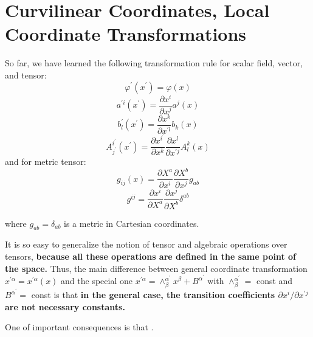 \section{Curvilinear Coordinates, Local Coordinate Transformations}
So far, we have learned the following transformation rule for scalar field, vector, and tensor:
$$
\varphi^{\prime}\left(x^{\prime}\right)=\varphi(x)
$$
$$
a^{\prime i}\left(x^{\prime}\right)=\frac{\partial x^{i}}{\partial x^{j}} a^{j}(x)
$$
$$
b_{l}^{\prime}\left(x^{\prime}\right)=\frac{\partial x^{k}}{\partial x^{\prime l}} b_{k}(x)
$$
$$
A_{j^{\prime}}^{i^{\prime}}\left(x^{\prime}\right)=\frac{\partial x^{i^{\prime}}}{\partial x^{k}} \frac{\partial x^{l}}{\partial x^{\prime j}} A_{l}^{k}(x)
$$
and for metric tensor:
\begin{equation}
    g_{i j}(x)=\frac{\partial X^{a}}{\partial x^{i}} \frac{\partial X^{b}}{\partial x^{j}} g_{a b}
    \label{metric-orthonormal}
\end{equation}
\begin{equation}
    g^{i j}=\frac{\partial x^{i}}{\partial X^{a}} \frac{\partial x^{j}}{\partial X^{b}} \delta^{a b}
\end{equation}


where $g_{a b}=\delta_{a b}$ is a metric in Cartesian coordinates.

It is so easy to generalize the notion of tensor and algebraic operations over tensors, \textbf{because all these operations are defined in the same point of the space.} Thus, the main difference between general coordinate transformation $x^{\prime \alpha}=x^{\prime \alpha}(x)$ and the special one $x^{\prime \alpha}=\wedge_{\beta}^{\alpha^{\prime}} x^{\beta}+B^{\alpha^{\prime}}$ with $\wedge_{\beta}^{\alpha^{\prime}}=$ const and $B^{\alpha^{\prime}}=$ const is that \textbf{in the general case, the transition coefficients $\partial x^{i} / \partial x^{\prime j}$ are not necessary constants.}

One of important consequences is that .

